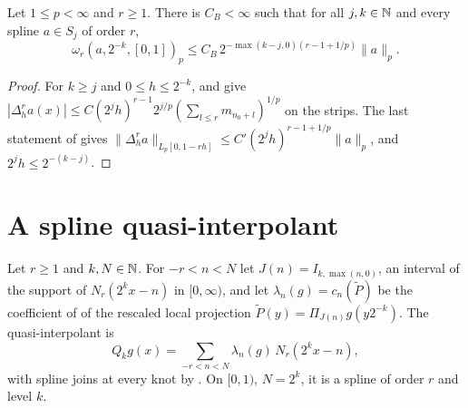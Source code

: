 \begin{theorem}
\label{thm:spline-inverse}
\leanok
{}
Let $1 \leq p < \infty$ and $r \geq 1$. There is $C_B < \infty$ such that for all $j, k \in \mathbb{N}$ and
every spline $a \in S_j$ of order $r$,
\[
  \omega_r(a, 2^{-k}, [0, 1])_p \leq C_B \, 2^{-\max(k - j, 0)(r - 1 + 1/p)} \|a\|_p .
\]
\end{theorem}

\begin{proof}
\leanok
For $k \geq j$ and $0 \leq h \leq 2^{-k}$,  and
 give
$|\Delta_h^r a(x)| \leq C (2^j h)^{r-1} 2^{j/p} (\sum_{l \leq r} m_{n_0 + l})^{1/p}$ on the
strips. The last statement of  gives
$\|\Delta_h^r a\|_{L_p[0, 1 - rh]} \leq C' (2^j h)^{r - 1 + 1/p} \|a\|_p$, and
$2^j h \leq 2^{-(k-j)}$.
\end{proof}

\section{A spline quasi-interpolant}

\begin{definition}
\label{def:quasi-interp}
\leanok
{}
Let $r \geq 1$ and $k, N \in \mathbb{N}$. For $-r < n < N$ let $J(n) = I_{k, \max(n, 0)}$, an interval of
the support of $N_r(2^k x - n)$ in $[0, \infty)$, and let $\lambda_n(g) = c_n(\tilde P)$ be the
coefficient of  of the rescaled local projection
$\tilde P(y) = \Pi_{J(n)} g(y 2^{-k})$. The quasi-interpolant is
\[
  Q_k g(x) = \sum_{-r < n < N} \lambda_n(g) \, N_r(2^k x - n) ,
\]
with spline joins at every knot by . On $[0, 1)$, $N = 2^k$, it is a
spline of order $r$ and level $k$.
\end{definition}

